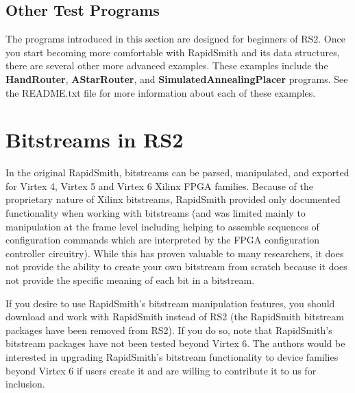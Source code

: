 \documentclass[10pt]{article}
\renewcommand{\texttt}[1]{%
  \begingroup
  \ttfamily
  \begingroup\lccode`~=`/\lowercase{\endgroup\def~}{/\discretionary{}{}{}}%
  \begingroup\lccode`~=`[\lowercase{\endgroup\def~}{[\discretionary{}{}{}}%
  \begingroup\lccode`~=`.\lowercase{\endgroup\def~}{.\discretionary{}{}{}}%
  \catcode`/=\active\catcode`[=\active\catcode`.=\active
  \scantokens{#1\noexpand}%
  \endgroup
}
\newcommand{\cls}[1]{{\texttt{#1}}}
\newcommand{\pgm}[1]{{\textbf{#1}}}
\newcommand{\bel}{\cls{Bel}\xspace}
\newcommand{\bels}{\cls{Bel}s\xspace}
\newcommand{\cell}{\cls{Cell}\xspace}
\newcommand{\cells}{\cls{Cell}s\xspace}
\newcommand{\cellnets}{\cls{CellNet}s\xspace}
\begin{document}

\subsection{Other Test Programs}
The programs introduced in this section are designed for beginners of RS2. Once
you start becoming more comfortable with RapidSmith and its data structures,
there are several other more advanced examples. These examples include the
\pgm{HandRouter}, \pgm{AStarRouter}, and \pgm{SimulatedAnnealingPlacer}
programs. See the README.txt file for more information about each of these
examples.

\pagebreak
\section{Bitstreams in RS2}

In the original RapidSmith, bitstreams can be parsed, manipulated, and exported
for Virtex 4, Virtex 5 and Virtex 6 Xilinx FPGA families.  Because of the
proprietary nature of Xilinx bitstreams, RapidSmith provided only documented
functionality when working with bitstreams (and was limited mainly to
manipulation at the frame level including helping to assemble sequences of
configuration commands which are interpreted by the FPGA configuration
controller circuitry).  While this has proven valuable to many researchers, it
does not provide the ability to create your own bitstream from scratch because
it does not provide the specific meaning of each bit in a bitstream.

If you desire to use RapidSmith's bitstream manipulation features, you should
download and work with RapidSmith instead of RS2 (the RapidSmith bitstream
packages have been removed from RS2).  If you do so, note that RapidSmith's
bitstream packages have not been tested beyond Virtex 6.  The authors would be
interested in upgrading RapidSmith's bitstream functionality to device families
beyond Virtex 6 if users create it and are willing to contribute it to us for
inclusion.
\end{document}
